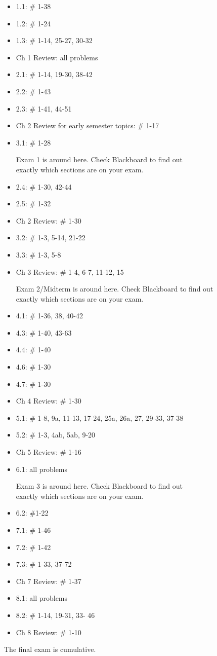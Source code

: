 \documentclass{article}
\begin{document}
\begin{itemize}
\item 1.1:  \# 1-38
\item 1.2:  \# 1-24
\item 1.3:  \# 1-14, 25-27, 30-32
\item Ch 1 Review:  all problems
\item 2.1:  \# 1-14, 19-30, 38-42
\item 2.2:  \# 1-43
\item 2.3:  \# 1-41, 44-51
\item Ch 2 Review for early semester topics: \# 1-17
\item 3.1: \# 1-28
\begin{center}
Exam 1 is around here.  Check Blackboard to find out\\ exactly which sections are on your exam.
\end{center}
\item 2.4:  \# 1-30, 42-44
\item 2.5: \# 1-32
\item Ch 2 Review: \# 1-30
\item 3.2: \# 1-3, 5-14, 21-22
\item 3.3: \# 1-3, 5-8
\item Ch 3 Review: \# 1-4, 6-7, 11-12, 15
\begin{center}
Exam 2/Midterm is around here.  Check Blackboard to find out\\ exactly which sections are on your exam.
\end{center}
\newpage\thispagestyle{empty}
\item 4.1:  \# 1-36, 38, 40-42
\item 4.3: \# 1-40, 43-63
\item 4.4: \# 1-40
\item 4.6: \# 1-30
\item 4.7: \# 1-30
\item Ch 4 Review: \# 1-30 
\item 5.1: \# 1-8, 9a, 11-13, 17-24, 25a, 26a, 27, 29-33, 37-38
\item 5.2: \# 1-3, 4ab, 5ab, 9-20
\item Ch 5 Review: \# 1-16
\item 6.1: all problems
\begin{center}
Exam 3 is around here.  Check Blackboard to find out\\ exactly which sections are on your exam.
\end{center}
\item 6.2: \#1-22
\item 7.1: \# 1-46
\item 7.2: \# 1-42
\item 7.3: \# 1-33, 37-72
\item Ch 7 Review: \# 1-37
\item 8.1: all problems
\item 8.2:  \# 1-14, 19-31, 33- 46
\item Ch 8 Review: \# 1-10
\end{itemize}
\begin{center}
The final exam is cumulative.
\end{center}
\end{document}
